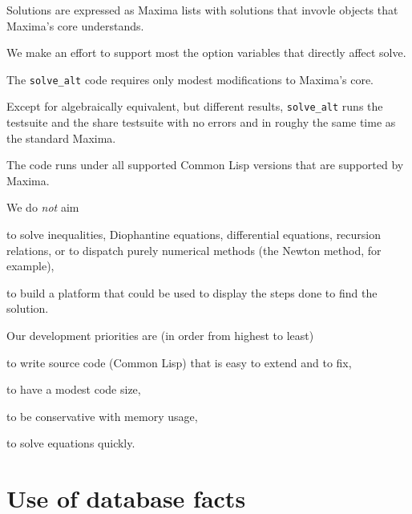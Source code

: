 \documentclass[]{scrartcl}
\newcommand{\altsolve}{\texttt{solve\_alt}}
\begin{document}
\begin{alphalist}[]

\item Solutions are expressed as Maxima lists with solutions that invovle objects that Maxima's core  understands.

\item We make an effort to support most the option variables that directly affect solve.

 \item The \altsolve\/ code requires only modest modifications to Maxima's core.

\item Except for algebraically equivalent, but different results, \altsolve\/  runs the testsuite and the share testsuite with no errors and in roughy the same time as the standard Maxima.

\item The code runs under all supported Common Lisp versions that are supported by Maxima.
\end{alphalist}
We do \emph{not} aim
\begin{alphalist}[]

\item to solve inequalities, Diophantine equations, differential equations, recursion relations, or to dispatch purely numerical methods (the Newton method, for example),

\item to build a platform that could be used to display the steps done to find the solution.

\end{alphalist}
Our development priorities are (in order from highest to least)

\begin{alphalist}[]

\item to write source code (Common Lisp) that is easy to extend and to fix,

\item to have a modest code size,

\item to be conservative with memory usage,

\item to solve equations quickly.

\end{alphalist}


\section{Use of database facts}
\end{document}
